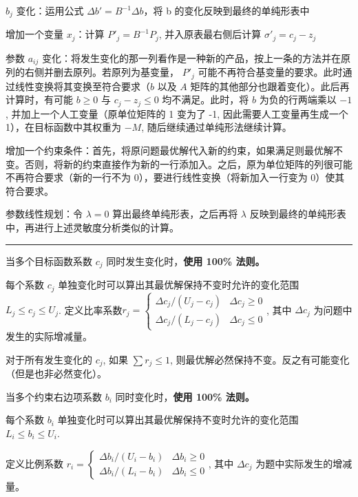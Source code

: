\documentclass[UTF8, 6pt]{ctexart}
\newcommand{\sectionline}{\rule[2pt]{0.45\textwidth}{0.05em}}
\begin{document}
$b_j$ 变化：运用公式 $\Delta b' = B^{-1} \Delta b$，将 b 的变化反映到最终的单纯形表中

增加一个变量 $x_j$：计算 $P'_j = B^{-1}P_j$, 并入原表最右侧后计算 $\sigma'_j = c_j-z_j$

参数 $a_{ij}$ 变化：将发生变化的那一列看作是一种新的产品，按上一条的方法并在原列的右侧并删去原列。若原列为基变量， $P'_j$ 可能不再符合基变量的要求。此时通过线性变换将其变换至符合要求（$b$ 以及 $A$ 矩阵的其他部分也跟着变化）。此后再计算时，有可能 $b \geq 0 $ 与 $c_j-z_j \leq 0$ 均不满足。此时，将 $b$ 为负的行两端乘以 $-1$, 并加上一个人工变量（原单位矩阵的 1 变为了 -1, 因此需要人工变量再生成一个 1），在目标函数中其权重为 $-M$, 随后继续通过单纯形法继续计算。 

增加一个约束条件：首先，将原问题最优解代入新的约束，如果满足则最优解不变。否则，将新的约束直接作为新的一行添加入。之后，原为单位矩阵的列很可能不再符合要求（新的一行不为 0），要进行线性变换（将新加入一行变为 0）使其符合要求。

参数线性规划：令 $\lambda = 0$ 算出最终单纯形表，之后再将 $\lambda$ 反映到最终的单纯形表中，再进行上述灵敏度分析类似的计算。

\sectionline

当多个目标函数系数 $c_j$ 同时发生变化时，\textbf{使用 100\% 法则。}

每个系数 $c_j$ 单独变化时可以算出其最优解保持不变时允许的变化范围 $L_j \leq c_j \leq U_j$.
定义比率系数$r_{j}=\left\{\begin{array}{ll}{\Delta c_{j} /\left(U_{j}-c_{j}\right)} & {\Delta c_{j} \geq 0} \\ {\Delta c_{j} /\left(L_{j}-c_{j}\right)} & {\Delta c_{j} \leq 0}\end{array}\right.$, 
其中 $\Delta c_j$ 为问题中发生的实际增减量。

对于所有发生变化的 $c_j$, 如果 $\sum r_j \leq 1$, 则最优解必然保持不变。反之有可能变化（但是也非必然变化）。


当多个约束右边项系数 $b_i$ 同时变化时，\textbf{使用 100\% 法则。}

每个系数 $b_i$ 单独变化时可以算出其最优解保持不变时允许的变化范围 $L_{i} \leq b_{i} \leq U_{i}$.

定义比例系数 $r_{i}=\left\{\begin{array}{ll}{\Delta b_{i} /\left(U_{i}-b_{i}\right)} & {\Delta b_{i} \geq 0} \\ {\Delta b_{i} /\left(L_{i}-b_{i}\right)} & {\Delta b_{i} \leq 0}\end{array}\right.$, 其中 $\Delta c_j$ 为题中实际发生的增减量。
\end{document}
